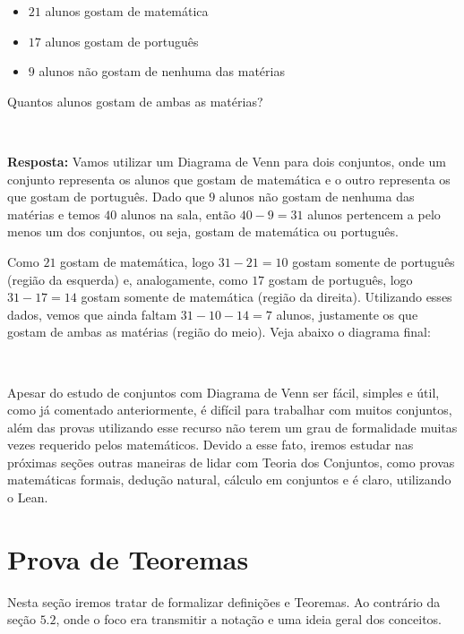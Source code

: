 \begin{itemize}
\item $21$ alunos gostam de matemática
\item $17$ alunos gostam de português
\item $9$ alunos não gostam de nenhuma das matérias
\end{itemize}

Quantos alunos gostam de ambas as matérias?

$\qquad$

\textbf{Resposta:} Vamos utilizar um Diagrama de Venn para dois conjuntos, onde um conjunto representa os alunos que gostam de matemática e o outro representa os que gostam de português.
Dado que $9$ alunos não gostam de nenhuma das matérias e temos $40$ alunos na sala, então $40-9=31$ alunos pertencem a pelo menos um dos conjuntos, ou seja, gostam de matemática ou português.

Como $21$ gostam de matemática, logo $31-21=10$ gostam somente de português (região da esquerda) e, analogamente, como $17$ gostam de português, logo $31-17=14$ gostam somente de matemática (região da direita). Utilizando esses dados, vemos que ainda faltam $31-10-14=7$ alunos, justamente os que gostam de ambas as matérias (região do meio). Veja abaixo o diagrama final:


$\qquad$

Apesar do estudo de conjuntos com Diagrama de Venn ser fácil, simples e útil, como já comentado anteriormente, é difícil para trabalhar com muitos conjuntos, além das provas utilizando esse recurso não terem um grau de formalidade muitas vezes requerido pelos matemáticos. Devido a esse fato, iremos estudar nas próximas seções outras maneiras de lidar com Teoria dos Conjuntos, como provas matemáticas formais, dedução natural, cálculo em conjuntos e é claro, utilizando o Lean.

\section{Prova de Teoremas}
Nesta seção iremos tratar de formalizar definições e Teoremas. Ao contrário da seção $5.2$, onde o foco era transmitir a notação e uma ideia geral dos conceitos.

